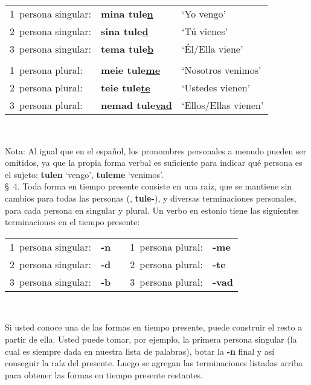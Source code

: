 \begin{tabular}{ l l l }
	1\textordmasculine\ persona singular: 	& \textbf{mina tule\underline{n}} 		& `Yo vengo' \\
	2\textordmasculine\ persona singular: 	& \textbf{sina tule\underline{d}} 		& `Tú vienes' \\
	3\textordmasculine\ persona singular: 	& \textbf{tema tule\underline{b}} 		& `Él/Ella viene' \\
	 & & \\
	1\textordmasculine\ persona plural:		& \textbf{meie tule\underline{me}} 		& `Nosotros venimos' \\
	2\textordmasculine\ persona plural:		& \textbf{teie tule\underline{te}} 		& `Ustedes vienen' \\
	3\textordmasculine\ persona plural:		& \textbf{nemad tule\underline{vad}} 	& `Ellos/Ellas vienen'
\end{tabular}\\ \bigskip

Nota: Al igual que en el español, los pronombres personales a menudo pueden ser omitidos, ya que la propia forma verbal es suficiente para indicar qué persona es el sujeto: \textbf{tulen} `vengo', \textbf{tuleme} `venimos'.\\

\S\ 4. Toda forma en tiempo presente consiste en una raíz, que se mantiene sin cambios para todas las personas (\eg, \textbf{tule-}), y diversas terminaciones personales, para cada persona en singular y plural. Un verbo en estonio tiene las siguientes terminaciones en el tiempo presente:\\

\begin{tabular}{ l l c l l }
	1\textordmasculine\ persona singular: & \textbf{-n}	& & 1\textordmasculine\ persona plural: & \textbf{-me} \\
	2\textordmasculine\ persona singular: & \textbf{-d}	& & 2\textordmasculine\ persona plural: & \textbf{-te} \\
	3\textordmasculine\ persona singular: & \textbf{-b}	& & 3\textordmasculine\ persona plural: & \textbf{-vad}
\end{tabular}\\ \bigskip

Si usted conoce una de las formas en tiempo presente, puede construir el resto a partir de ella. Usted puede tomar, por ejemplo, la primera persona singular (la cual es siempre dada en nuestra lista de palabras), botar la \textbf{-n} final y así conseguir la raíz del presente. Luego se agregan las terminaciones listadas arriba para obtener las formas en tiempo presente restantes.\\

